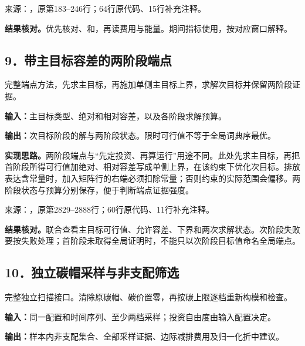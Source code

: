 {\small 来源：，原第183--246行；64行原代码、15行补充注释。}\par

\begingroup
{}

\endgroup

\noindent\textbf{结果核对。}优先核对、和，再读费用与能量。期间指标使用，按对应窗口解释。

\subsection*{9．带主目标容差的两阶段端点}
完整端点方法，先求主目标，再施加单侧主目标上界，求解次目标并保留两阶段证据。

\noindent\textbf{输入：}主目标类型、绝对和相对容差，以及各阶段求解预算。\par
\noindent\textbf{输出：}次目标阶段的解与两阶段状态。限时可行值不等于全局词典序最优。\par

\noindent\textbf{实现思路。}两阶段端点与“先定投资、再算运行”用途不同。此处先求主目标，再把首阶段所得可行值加绝对、相对容差写成单侧上界，在该约束下优化次目标。排放表达含常量时，加入矩阵行的右端必须扣除常量；否则约束的实际范围会偏移。两阶段状态与预算分别保存，便于判断端点证据强度。

{\small 来源：，原第2829--2888行；60行原代码、11行补充注释。}\par

\begingroup
{}

\endgroup

\noindent\textbf{结果核对。}联合查看主目标可行值、允许容差、下界和两次求解状态。次阶段失败要按失败处理；首阶段未取得全局证明时，不能只以次阶段目标值命名全局端点。

\subsection*{10．独立碳帽采样与非支配筛选}
完整独立扫描接口。清除原碳帽、碳价置零，再按碳上限逐档重新构模和检查。

\noindent\textbf{输入：}同一配置和时间序列、至少两档采样；投资自由度由输入配置决定。\par
\noindent\textbf{输出：}样本内非支配集合、全部采样证据、边际减排费用及归一化折中建议。\par

